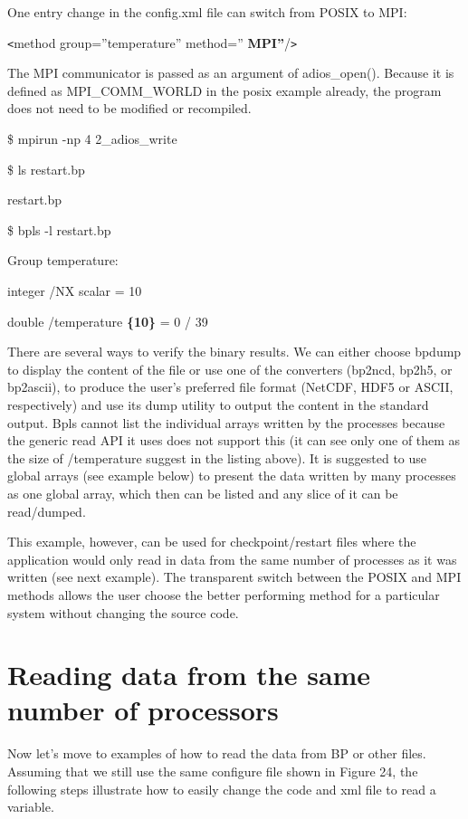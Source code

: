 One entry change in the config.xml file can switch from POSIX to MPI:

\leftskip=18pt
\texttt{<}method group=''temperature'' method=''{\color{color02} \textbf{MPI''}}/\texttt{>}

\leftskip=0pt
The MPI communicator is passed as an argument of adios\_open(). Because it is defined 
as MPI\_COMM\_WORLD in the posix example already, the program does not need to 
be modified or recompiled.

\$ mpirun -np 4 2\_adios\_write

\$ ls restart.bp

restart.bp

\$ bpls -l restart.bp

Group temperature:

\parindent=7pt
integer    /NX           scalar = 10 

double     /temperature  {\color{color06} \textbf{\{10\}}} = 0 / 39

\parindent=0pt
There are several ways to verify the binary results. We can either choose bpdump 
to display the content of the file or use one of the converters (bp2ncd, bp2h5, 
or bp2ascii), to produce the user's preferred file format (NetCDF, HDF5 or ASCII, 
respectively) and use its dump utility to output the content in the standard output. 
Bpls cannot list the individual arrays written by the processes because the generic 
read API it uses does not support this (it can see only one of them as the size 
of /temperature suggest in the listing above). It is suggested to use global arrays 
(see example below) to present the data written by many processes as one global 
array, which then can be listed and any slice of it can be read/dumped. 

This example, however, can be used for checkpoint/restart files where the application 
would only read in data from the same number of processes as it was written (see 
next example). The transparent switch between the POSIX and MPI methods allows 
the user choose the better performing method for a particular system without changing 
the source code. \label{HToc84890297}\label{HToc212016673}\label{HToc212016915}\label{HToc182553445}

\section{Reading data from the same number of processors}

Now let's move to examples of how to read the data from BP or other files.  Assuming 
that we still use the same configure file shown in Figure 24, the following steps 
illustrate how to easily change the code and xml file to read a variable. 

